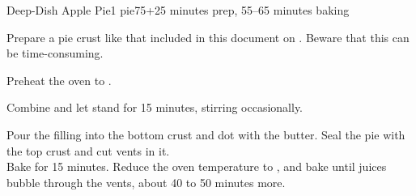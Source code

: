 \documentclass[../Cookbook.tex]{subfiles}
\begin{document}
\begin{recipe}{Deep-Dish Apple Pie}{1 pie}{75+25 minutes prep, 55--65 minutes baking}

	Prepare a pie crust like that included in this document on . Beware that this can be time-consuming.

	\newstep
	Preheat the oven to .

	Combine and let stand for 15 minutes, stirring occasionally.

	Pour the filling into the bottom crust and dot with the butter. Seal the pie with the top crust and cut vents in it.\\
	Bake for 15 minutes.
	Reduce the oven temperature to , and bake until juices bubble through the vents, about 40 to 50 minutes more.

\end{recipe}
\end{document}
